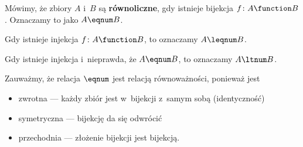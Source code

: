 \begin{definition}
Mówimy, że zbiory \(A\) i~\(B\) są \textbf{równoliczne}, gdy istnieje bijekcja \(f\colon A \function B\). Oznaczamy to jako \(A \eqnum B\).

Gdy istnieje injekcja \(f\colon A \function B\), to oznaczamy \(A \leqnum B\).

Gdy istnieje injekcja i~nieprawda, że \(A \eqnum B\), to oznaczamy \(A \ltnum B\).
\end{definition}
Zauważmy, że relacja \({\eqnum}\) jest relacją równoważności, ponieważ jest
\begin{itemize}
    \item zwrotna --- każdy zbiór jest w~bijekcji z~samym sobą (identyczność)
    \item symetryczna --- bijekcję da się odwrócić
    \item przechodnia --- złożenie bijekcji jest bijekcją.
\end{itemize}
